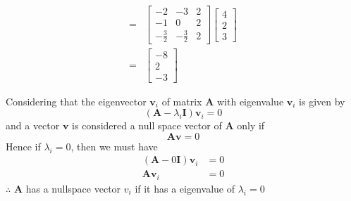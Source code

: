 \documentclass[12pt]{article}
\newcommand{\matr}[1]{\bm{#1}}
\newenvironment{question}[2][Question]{\begin{trivlist}
    \item[\hskip \labelsep {\bfseries #1}\hskip \labelsep {\bfseries #2.}]}{\end{trivlist}}
\begin{document}
\begin{align}
	= & \left[\begin{matrix}-2 & -3 & 2  \\-1 & 0 & 2\\- \frac{3}{2} & - \frac{3}{2} & 2\end{matrix}\right]	\left[\begin{matrix}4\\2\\3\end{matrix}\right] \\
	=&\left[\begin{matrix}-8\\2\\-3\end{matrix}\right]
\end{align}

\begin{question}{Q. 3}\end{question}
Considering that the eigenvector $\matr v_i$ of matrix $\matr A$ with eigenvalue $\matr v_i$ is given by
\begin{equation}
	\left(\matr A - \lambda_i \matr I \right)\matr v_i = 0 
\end{equation}
and a vector $\matr v$ is considered a null space vector of $\matr A$ only if
\begin{equation}
	\matr A \matr v = 0
\end{equation}
Hence if $\lambda_i = 0$, then we must have
\begin{align}
	(\matr A - 0 \matr I) \matr v _i & = 0 \\
	\matr A \matr v _ i              & = 0 
\end{align}
$\therefore$ $\matr A$ has a nullspace vector $v_i$ if it has a eigenvalue of $\lambda _i=0$\\ \\
\end{document}
